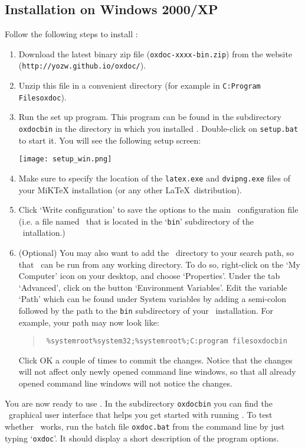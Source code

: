 \subsection{Installation on Windows 2000/XP}
Follow the following steps to install \oxdoc:
\begin{enumerate}
\item Download the latest binary zip file ({\tt oxdoc-xxxx-bin.zip}) from
the website \\({\tt http://yozw.github.io/oxdoc/}). 
\item Unzip this file in a convenient directory
(for example in {\tt C:\bs Program Files\bs oxdoc}). 
\item Run the set up program. This program can be found in the subdirectory {\tt oxdoc\bs bin}
in the directory in which you installed \oxdoc. Double-click on {\tt setup.bat} to start it.
You will see the following setup screen:
\begin{center}
\texttt{[image: setup\_win.png]}
\end{center}
\item Make sure to specify the location of the {\tt latex.exe} and {\tt dvipng.exe} files
of your MiKTeX installation (or any other \LaTeX~distribution). 
\item Click `Write configuration' to save the options to the main \oxdoc~configuration file
(i.e. a file named \oxdocxml~that is located in the `{\tt bin}' subdirectory of the \oxdoc~intallation.)
\item (Optional) You may also want to add the \oxdoc~directory to your search path, so that \oxdoc~can
be run from any working directory. To do so, right-click on the `My Computer' icon
on your desktop, and choose `Properties'. Under the tab `Advanced', click on the
button `Environment Variables'. Edit the variable `Path' which can be found under System 
variables by adding a semi-colon followed by the path to the {\tt bin} subdirectory 
of your \oxdoc~installation. For example, your path may now look like:
\begin{quote}\tt
	\%systemroot\%\bs system32;\%systemroot\%;C:\bs program files\bs oxdoc\bs bin
\end{quote}
Click OK a couple of times to commit the changes. Notice that the changes will not
affect only newly opened command line windows, so that all already opened command line
windows will not notice the changes.
\end{enumerate}

You are now ready to use \oxdoc. In the subdirectory {\tt oxdoc\bs bin}
you can find the \oxdoc~graphical user interface that helps you get started
with running \oxdoc. 
To test whether \oxdoc~works, run the batch file {\tt oxdoc.bat} from the command line
by just typing `{\tt oxdoc}'.  It should 
display a short description of the program options.






